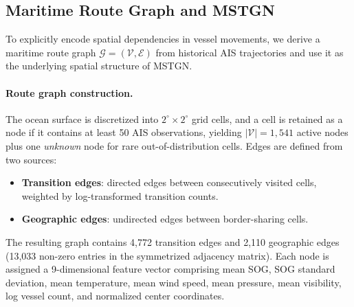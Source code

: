 \documentclass[sigconf,anonymous]{acmart}%
\begin{document}
\subsection{Maritime Route Graph and MSTGN}
\label{sec:mstgn}

To explicitly encode spatial dependencies in vessel movements, we derive a maritime route graph $\mathcal{G} = (\mathcal{V}, \mathcal{E})$ from historical AIS trajectories and use it as the underlying spatial structure of MSTGN.

\paragraph{Route graph construction.}
The ocean surface is discretized into $2^\circ \times 2^\circ$ grid cells, and a cell is retained as a node if it contains at least 50 AIS observations, yielding $|\mathcal{V}| = 1{,}541$ active nodes plus one \textit{unknown} node for rare out-of-distribution cells. Edges are defined from two sources:
\begin{itemize}
    \item \textbf{Transition edges}: directed edges between consecutively visited cells, weighted by log-transformed transition counts.
    \item \textbf{Geographic edges}: undirected edges between border-sharing cells.
\end{itemize}
The resulting graph contains 4{,}772 transition edges and 2{,}110 geographic edges (13{,}033 non-zero entries in the symmetrized adjacency matrix). Each node is assigned a 9-dimensional feature vector comprising mean SOG, SOG standard deviation, mean temperature, mean wind speed, mean pressure, mean visibility, log vessel count, and normalized center coordinates.
\end{document}
